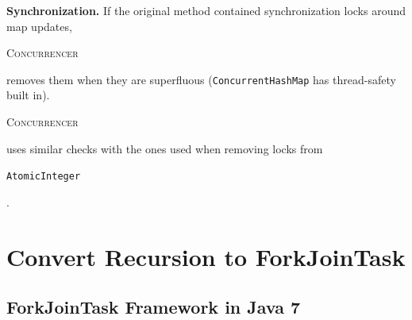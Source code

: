 \documentclass[10pt,twocolumn]{article}
\newcommand{\tool}{\begin{scriptsize}\textsc{Concurrencer}\end{scriptsize}\xspace}
\newenvironment{CodeOut}{\begin{scriptsize}}{\end{scriptsize}}
\newcommand{\code}[1]{\begin{smaller}\texttt{#1}\end{smaller}}
\newcommand{\codex}[1]{{\smaller\texttt{#1}}\xspace}
\newcommand{\myParagraph}[1]{\textbf{#1}}
\newcommand{\MaxWidth}{\columnwidth}
\newcommand{\ConcurrentHashMap}{\codex{Con\-cur\-rent\-Hash\-Map}}
\begin{document}
% 
%  
%   
% 
% 
% 
%  
%  

\myParagraph{Synchronization.}
If the original method contained synchronization locks around map
updates, \tool removes them when they are superfluous (\ConcurrentHashMap has
thread-safety built in). \tool uses similar checks with the ones used when
removing locks from \code{AtomicInteger}.

\section{Convert Recursion to ForkJoinTask}

\subsection{ForkJoinTask Framework in Java 7}
\end{document}
